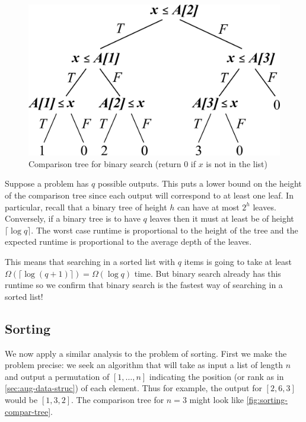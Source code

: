 \begin{figure}[h]
    \centering
    \includegraphics[scale=0.55]{Images/search_compar_tree.png}
    \caption{Comparison tree for binary search (return 0 if $x$ is not in the list)}
    \label{fig:search-compar-tree}
\end{figure}

Suppose a problem has $q$ possible outputs. This puts a lower bound on the height of the comparison tree since each output will correspond to at least one leaf. In particular, recall that a binary tree of height $h$ can have at most $2^h$ leaves. Conversely, if a binary tree is to have $q$ leaves then it must at least be of height $\lceil \log q \rceil$. The worst case runtime is proportional to the height of the tree and the expected runtime is proportional to the average depth of the leaves.
\begin{remark}
This means that searching in a sorted list with $q$ items is going to take at least $\Omega(\lceil \log (q + 1) \rceil) = \Omega(\log q)$ time. But binary search already has this runtime so we confirm that binary search is the fastest way of searching in a sorted list!
\end{remark}

\subsection{Sorting}
We now apply a similar analysis to the problem of sorting. First we make the problem precise: we seek an algorithm that will take as input a list of length $n$ and output a permutation of $[1, \dots, n]$ indicating the position (or rank as in \autoref{sec:aug-data-struc}) of each element. Thus for example, the output for $[2, 6, 3]$ would be $[1, 3, 2]$. The comparison tree for $n = 3$ might look like \autoref{fig:sorting-compar-tree}.

